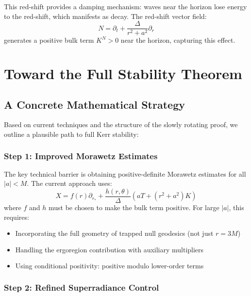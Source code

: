 \documentclass[12pt,a4paper]{article}
\begin{document}
This red-shift provides a damping mechanism: waves near the horizon lose energy to the red-shift, which manifests as decay. The red-shift vector field:
\begin{equation}
N = \partial_t + \frac{\Delta}{r^2 + a^2}\partial_r
\end{equation}
generates a positive bulk term $K^N > 0$ near the horizon, capturing this effect.

\section{Toward the Full Stability Theorem}

\subsection{A Concrete Mathematical Strategy}

Based on current techniques and the structure of the slowly rotating proof, we outline a plausible path to full Kerr stability:

\subsubsection{Step 1: Improved Morawetz Estimates}

The key technical barrier is obtaining positive-definite Morawetz estimates for all $|a| < M$. The current approach uses:
\begin{equation}
X = f(r)\partial_{r_*} + \frac{h(r,\theta)}{\Delta}(aT + (r^2+a^2)K)
\end{equation}
where $f$ and $h$ must be chosen to make the bulk term positive. For large $|a|$, this requires:
\begin{itemize}
    \item Incorporating the full geometry of trapped null geodesics (not just $r = 3M$)
    \item Handling the ergoregion contribution with auxiliary multipliers
    \item Using conditional positivity: positive modulo lower-order terms
\end{itemize}

\subsubsection{Step 2: Refined Superradiance Control}
\end{document}
